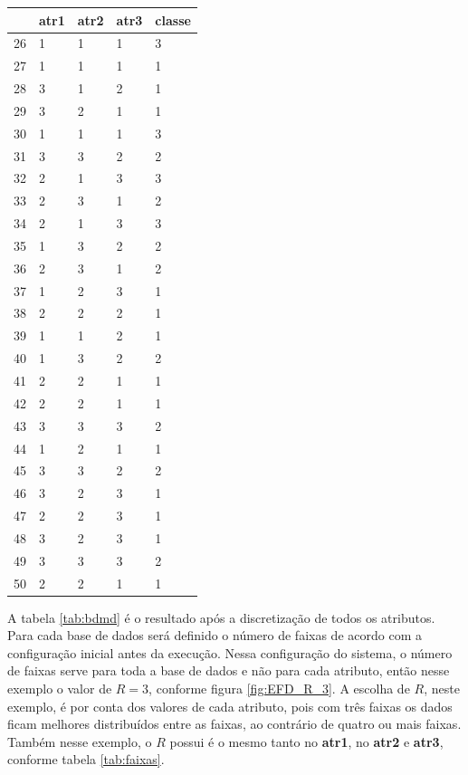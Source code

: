 \begin{table}[!ht]
\begin{tabular}{ |lllll| }
\hline
  & atr1 & atr2 & atr3 & classe \\ \hline
26	&	1	&	1	&	1	&	3	\\	\hline
27	&	1	&	1	&	1	&	1	\\	\hline
28	&	3	&	1	&	2	&	1	\\	\hline
29	&	3	&	2	&	1	&	1	\\	\hline
30	&	1	&	1	&	1	&	3	\\	\hline
31	&	3	&	3	&	2	&	2	\\	\hline
32	&	2	&	1	&	3	&	3	\\	\hline
33	&	2	&	3	&	1	&	2	\\	\hline
34	&	2	&	1	&	3	&	3	\\	\hline
35	&	1	&	3	&	2	&	2	\\	\hline
36	&	2	&	3	&	1	&	2	\\	\hline
37	&	1	&	2	&	3	&	1	\\	\hline
38	&	2	&	2	&	2	&	1	\\	\hline
39	&	1	&	1	&	2	&	1	\\	\hline
40	&	1	&	3	&	2	&	2	\\	\hline
41	&	2	&	2	&	1	&	1	\\	\hline
42	&	2	&	2	&	1	&	1	\\	\hline
43	&	3	&	3	&	3	&	2	\\	\hline
44	&	1	&	2	&	1	&	1	\\	\hline
45	&	3	&	3	&	2	&	2	\\	\hline
46	&	3	&	2	&	3	&	1	\\	\hline
47	&	2	&	2	&	3	&	1	\\	\hline
48	&	3	&	2	&	3	&	1	\\	\hline
49	&	3	&	3	&	3	&	2	\\	\hline
50	&	2	&	2	&	1	&	1	\\	\hline

\end{tabular}
\end{table}

A tabela \ref{tab:bdmd} é o resultado após a discretização de todos os atributos. Para cada base de dados será definido o número de faixas de acordo com a configuração inicial antes da execução. Nessa configuração do sistema, o número de faixas serve para toda a base de dados e não para cada atributo, então nesse exemplo o valor de ${R=3}$, conforme figura \ref{fig:EFD_R_3}. A escolha de ${R}$, neste exemplo, é por conta dos valores de cada atributo, pois com três faixas os dados ficam melhores distribuídos entre as faixas, ao contrário de quatro ou mais faixas. Também nesse exemplo, o ${R}$ possui é o mesmo tanto no \textbf{atr1},  no \textbf{atr2} e \textbf{atr3}, conforme tabela \ref{tab:faixas}. 

